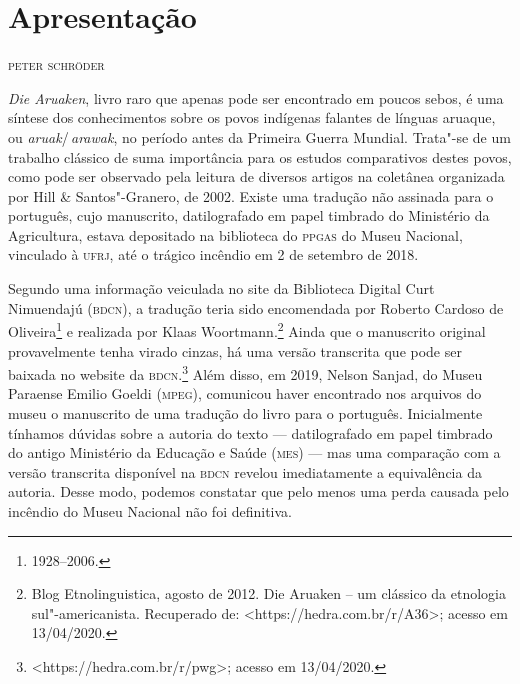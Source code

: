 \newcommand{\subtitulo}[1]{\NoCaseChange{\textnormal{\break\Large\itshape#1}}}
\chapter*{Apresentação\smallskip\subtitulo{Um clássico da etnologia\\ sul-americanista}}


\begin{flushright}
\textsc{peter schröder}\medskip
\end{flushright}

\noindent{}\textit{Die Aruaken}, livro raro que apenas pode ser encontrado em poucos
sebos, é uma síntese dos conhecimentos sobre os povos indígenas falantes
de línguas aruaque, ou \textit{aruak}/\,\textit{arawak}, no período antes da Primeira Guerra Mundial. Trata"-se de um trabalho clássico de suma importância para os
estudos comparativos destes povos, como pode ser observado pela
leitura de diversos artigos na coletânea organizada por Hill \&
Santos"-Granero, de 2002. Existe uma tradução não assinada para o
português, cujo manuscrito, datilografado em papel timbrado do
Ministério da Agricultura, estava depositado na biblioteca do \textsc{ppgas} do
Museu Nacional, vinculado à \textsc{ufrj}, até o trágico incêndio em 2 de setembro de 2018.

Segundo uma informação veiculada no site da Biblioteca Digital
Curt Nimuendajú (\textsc{bdcn}), a tradução teria sido encomendada por Roberto
Cardoso de Oliveira\footnote{1928--2006.} e realizada por Klaas Woortmann.\footnote{Blog Etnolinguistica, agosto de 2012. Die Aruaken --
  um clássico da etnologia sul"-americanista. Recuperado de:
  \textless{}https://hedra.com.br/r/A36\textgreater{};
  acesso em 13/04/2020.} Ainda que o manuscrito original provavelmente tenha virado
cinzas, há uma versão transcrita que pode ser baixada no website da
\textsc{bdcn}.\footnote{\textless{}https://hedra.com.br/r/pwg\textgreater{};
  acesso em 13/04/2020.} Além disso, em 2019, Nelson Sanjad, do Museu
Paraense Emilio Goeldi (\textsc{mpeg}), comunicou haver encontrado nos arquivos do museu o manuscrito de uma tradução
do livro para o português. Inicialmente tínhamos dúvidas sobre a
autoria do texto --- datilografado em papel timbrado do
antigo Ministério da Educação e Saúde (\textsc{mes}) --- mas uma comparação com a
versão transcrita disponível na \textsc{bdcn} revelou imediatamente a equivalência da autoria. 
Desse modo, podemos constatar que pelo menos uma perda
causada pelo incêndio do Museu Nacional não foi definitiva.

